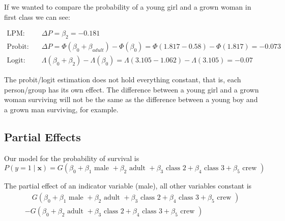 \documentclass[11pt]{article}
\begin{document}
If we wanted to compare the probability of a young girl and a grown woman in first class we can see:

\begin{align}
    \text{LPM:} & \quad \Delta P = \beta_{2} = -0.181 \\
    \text{Probit:} & \quad \Delta P = \Phi(\beta_0 + \beta_{adult}) - \Phi(\beta_0) = \Phi(1.817-0.58) - \Phi(1.817)  = - 0.073\\
    \text{Logit:} & \quad \Lambda(\beta_0 + \beta_{2}) - \Lambda(\beta_0) = \Lambda(3.105 - 1.062) - \Lambda(3.105)  = - 0.07
\end{align}

\begin{note}
    The probit/logit estimation does not hold everything constant, that is, each person/group has its own effect. The difference between a young girl and a grown woman surviving will not be the same as the difference between a young boy and a grown man surviving, for example.
\end{note}

\subsection{Partial Effects}

Our model for the probability of survival is
\begin{equation}
P(y=1 \mid \boldsymbol{x})=G\left(\beta_0+\beta_1 \text { male }+\beta_2 \text { adult }+\beta_3 \text { class } 2+\beta_4 \text { class } 3+\beta_5 \text { crew }\right)
\end{equation}

The partial effect of an indicator variable (male), all other variables constant is
\begin{equation}
\begin{gathered}
\quad G\left(\beta_0+\beta_1 \text{ male }+\beta_2 \text { adult }+\beta_3 \text { class } 2+\beta_4 \text { class } 3+\beta_5 \text { crew }\right) \\
-G\left(\beta_0+\beta_2 \text { adult }+\beta_3 \text { class } 2+\beta_4 \text { class } 3+\beta_5 \text { crew }\right)
\end{gathered}
\end{equation}
\end{document}
